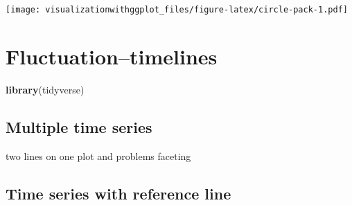 \documentclass[]{krantz}
\makeatletter
\newenvironment{Shaded}{\begin{snugshade}}{\end{snugshade}}
\newcommand{\KeywordTok}[1]{\textcolor[rgb]{0.13,0.29,0.53}{\textbf{#1}}}
\newcommand{\NormalTok}[1]{#1}
\newenvironment{kframe}{%
\medskip{}
\setlength{\fboxsep}{.8em}
 \def\at@end@of@kframe{}%
 \ifinner\ifhmode%
  \def\at@end@of@kframe{\end{minipage}}%
  \begin{minipage}{\columnwidth}%
 \fi\fi%
 \def\FrameCommand##1{\hskip\@totalleftmargin \hskip-\fboxsep
 \colorbox{shadecolor}{##1}\hskip-\fboxsep
     \hskip-\linewidth \hskip-\@totalleftmargin \hskip\columnwidth}%
 \MakeFramed {\advance\hsize-\width
   \@totalleftmargin\z@ \linewidth\hsize
   \@setminipage}}%
 {\par\unskip\endMakeFramed%
 \at@end@of@kframe}
\renewenvironment{Shaded}{\begin{kframe}}{\end{kframe}}
\theoremstyle{definition}
\theoremstyle{definition}
\theoremstyle{definition}
\theoremstyle{remark}
\makeatother
\begin{document}
\texttt{[image: visualizationwithggplot\_files/figure-latex/circle-pack-1.pdf]}

\cleardoublepage 

\chapter{Fluctuation--timelines}\label{Fluctuation}

\begin{Shaded}
\begin{Highlighting}[]
\KeywordTok{library}\NormalTok{(tidyverse)}
\end{Highlighting}
\end{Shaded}

\section{Multiple time series}\label{multiple-time-series}

two lines on one plot and problems faceting

\section{Time series with reference
line}\label{time-series-with-reference-line}
\end{document}
